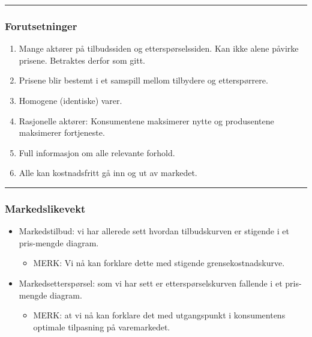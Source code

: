 \documentclass[
  letterpaper,
  DIV=11,
  numbers=noendperiod]{scrartcl}
\providecommand{\tightlist}{%
  \setlength{\itemsep}{0pt}\setlength{\parskip}{0pt}}\usepackage{longtable,booktabs,array}
\begin{document}
\begin{center}\rule{0.5\linewidth}{0.5pt}\end{center}

\subsubsection{Forutsetninger}\label{forutsetninger}

\begin{enumerate}
\def\labelenumi{\arabic{enumi}.}
\tightlist
\item
  Mange aktører på tilbudssiden og etterspørselssiden. Kan ikke alene
  påvirke prisene. Betraktes derfor som gitt.
\item
  Prisene blir bestemt i et samspill mellom tilbydere og etterspørrere.
\item
  Homogene (identiske) varer.
\item
  Rasjonelle aktører: Konsumentene maksimerer nytte og produsentene
  maksimerer fortjeneste.
\item
  Full informasjon om alle relevante forhold.
\item
  Alle kan kostnadsfritt gå inn og ut av markedet.
\end{enumerate}

\begin{center}\rule{0.5\linewidth}{0.5pt}\end{center}

\subsubsection{Markedslikevekt}\label{markedslikevekt-1}

\begin{itemize}
\tightlist
\item
  Markedstilbud: vi har allerede sett hvordan tilbudskurven er stigende
  i et pris-mengde diagram.

  \begin{itemize}
  \tightlist
  \item
    MERK: Vi nå kan forklare dette med stigende grensekostnadskurve.
  \end{itemize}
\item
  Markedsetterspørsel: som vi har sett er etterspørselskurven fallende i
  et pris-mengde diagram.

  \begin{itemize}
  \tightlist
  \item
    MERK: at vi nå kan forklare det med utgangspunkt i konsumentens
    optimale tilpasning på varemarkedet.
  \end{itemize}
\end{itemize}
\end{document}
